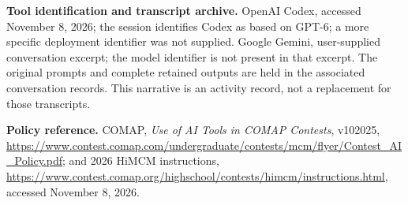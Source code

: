 \noindent\textbf{Tool identification and transcript archive.} OpenAI Codex, accessed November 8, 2026; the session identifies Codex as based on GPT-6; a more specific deployment identifier was not supplied. Google Gemini, user-supplied conversation excerpt; the model identifier is not present in that excerpt. The original prompts and complete retained outputs are held in the associated conversation records. This narrative is an activity record, not a replacement for those transcripts.

\noindent\textbf{Policy reference.} COMAP, \emph{Use of AI Tools in COMAP Contests}, v102025, \url{https://www.contest.comap.com/undergraduate/contests/mcm/flyer/Contest_AI_Policy.pdf}; and 2026 HiMCM instructions, \url{https://www.contest.comap.org/highschool/contests/himcm/instructions.html}, accessed November 8, 2026.
